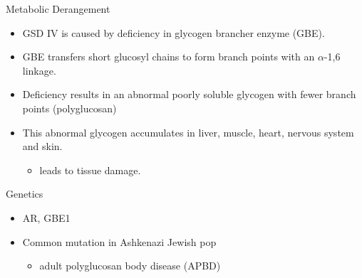 \documentclass[presentation, smaller]{beamer}
\begin{document}
\begin{frame}[label={sec:org969b711}]{Metabolic Derangement}
\begin{itemize}
\item GSD IV is caused by deficiency in glycogen brancher enzyme (GBE).
\item GBE transfers short glucosyl chains to form branch points with an
\(\alpha\)-1,6 linkage.
\item Deficiency results in an abnormal poorly soluble glycogen with fewer branch points (polyglucosan)
\item This abnormal glycogen accumulates in liver, muscle, heart, nervous system and skin.
\begin{itemize}
\item leads to tissue damage.
\end{itemize}
\end{itemize}
\end{frame}

\begin{frame}[label={sec:org10a4dfa}]{Genetics}
\begin{itemize}
\item AR, GBE1
\item Common mutation in Ashkenazi Jewish pop
\begin{itemize}
\item adult polyglucosan body disease (APBD)
\end{itemize}
\end{itemize}
\end{frame}
\end{document}
